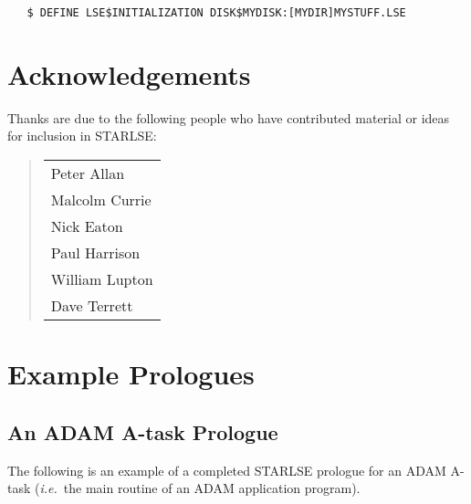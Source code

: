 \begin{verbatim}
   $ DEFINE LSE$INITIALIZATION DISK$MYDISK:[MYDIR]MYSTUFF.LSE
\end{verbatim}


\section{Acknowledgements}

Thanks are due to the following people who have contributed material or
ideas for inclusion in \mbox{STARLSE}:

\begin{quote}
\begin{tabular}{l}
Peter Allan \\
Malcolm Currie \\
Nick Eaton \\
Paul Harrison \\
William Lupton \\
Dave Terrett
\end{tabular}
\end{quote}

\newpage
\appendix

\section{Example Prologues}
\label{section:prologues}

\subsection{An ADAM A-task Prologue}

The following is an example of a completed STARLSE prologue for an ADAM
A-task ({\em i.e.}\ the main routine of an ADAM application program).

